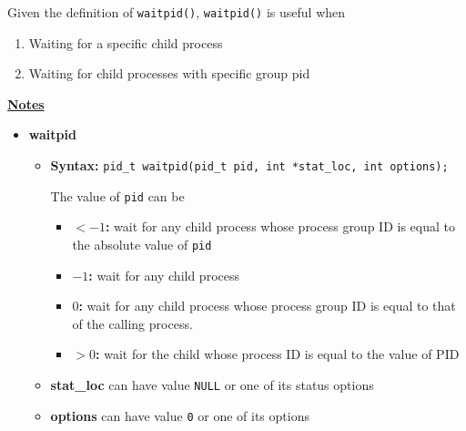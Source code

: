 \documentclass[12pt]{article}
\begin{document}
\begin{enumerate}[1.]
    \bigskip

    Given the definition of \texttt{waitpid()}, \texttt{waitpid()} is useful when

    \begin{enumerate}[1)]
        \item Waiting for a specific child process
        \item Waiting for child processes with specific group pid
    \end{enumerate}

    \bigskip

    \underline{\textbf{Notes}}

    \bigskip

    \begin{itemize}
        \item \textbf{waitpid}

        \begin{itemize}
            \item \textbf{Syntax:} \texttt{pid\_t waitpid(pid\_t pid, int *stat\_loc, int options);}

            \bigskip

            The value of \texttt{pid} can be
            \begin{itemize}
                \item \textbf{$<-1$:} wait for any child process whose process group ID is equal to
                the absolute value of \texttt{pid}
                \item \textbf{$-1$:} wait for any child process
                \item \textbf{$0$:} wait for any child process whose process group ID is equal to that of the
                calling process.
                \item \textbf{$>0$:} wait for the child whose process ID is equal to the value of PID
            \end{itemize}

            \item \textbf{stat\_loc} can have value \texttt{NULL} or one of its status options
            \item \textbf{options} can have value \texttt{0} or one of its options
        \end{itemize}
    \end{itemize}

\end{enumerate}
\end{document}
